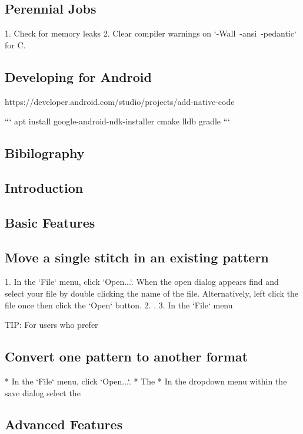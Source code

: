 \documentclass[a4paper]{report}
\begin{document}
\subsection{Perennial Jobs}

1. Check for memory leaks
2. Clear compiler warnings on `-Wall\ -ansi\ -pedantic` for C.

\subsection{Developing for Android}

https://developer.android.com/studio/projects/add-native-code

```
apt install google-android-ndk-installer cmake lldb gradle
```

\subsection{Bibilography}

\subsection{Introduction}

\subsection{Basic Features}

\subsection{Move a single stitch in an existing pattern}

1. In the `File` menu, click `Open...`. When the open dialog appears find and select your file by double clicking the name of the file. Alternatively, left click the file once then click the `Open` button.
2. .
3. In the `File` menu

TIP: For users who prefer

\subsection{Convert one pattern to another format}

* In the `File` menu, click `Open...`.
* The
* In the dropdown menu within the save dialog select the

\subsection{Advanced Features}
\end{document}
